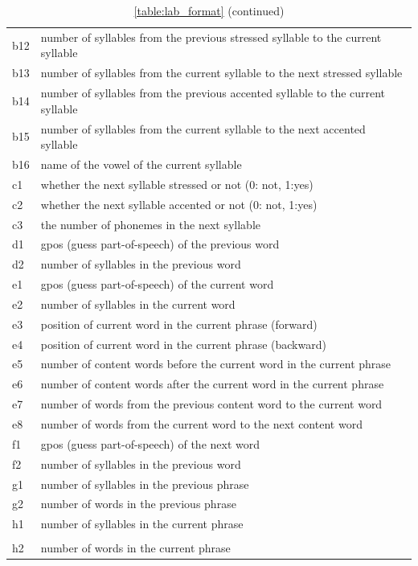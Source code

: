 \begin{longtable}[!htpb]{p{} p{}}
b12 & number of syllables from the previous stressed syllable to the current syllable\\
b13 & number of syllables from the current syllable to the next stressed syllable\\
b14 & number of syllables from the previous accented syllable to the current syllable\\
b15 & number of syllables from the current syllable to the next accented syllable\\
b16 & name of the vowel of the current syllable\\
\midrule
c1 & whether the next syllable stressed or not (0: not, 1:yes) \\
c2 & whether the next syllable accented or not (0: not, 1:yes) \\
c3 & the number of phonemes in the next syllable \\
\midrule
d1 & gpos (guess part-of-speech) of the previous word \\
d2 & number of syllables in the previous word \\
\midrule
e1 & gpos (guess part-of-speech) of the current word \\
e2 & number of syllables in the current word \\
e3 & position of current word in the current phrase (forward) \\
e4 & position of current word in the current phrase (backward) \\
e5 & number of content words before the current word in the current phrase \\
e6 & number of content words after the current word in the current phrase \\
e7 & number of words from the previous content word to the current word \\
e8 & number of words from the current word to the next content word \\
\midrule
f1 & gpos (guess part-of-speech) of the next word \\
f2 & number of syllables in the previous word \\
\midrule
g1 & number of syllables in the previous phrase \\
g2 & number of words in the previous phrase \\
\midrule
h1 & number of syllables in the current phrase \\
\caption*{\tablename{} \ref{table:lab_format} (continued)}\\
\toprule
h2 & number of words in the current phrase \\

\end{longtable}
